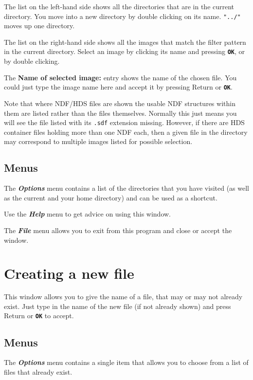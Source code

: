\documentclass[11pt,nolof]{starlink}
\providecommand{\butt}[1]{{\bf \tt #1}}
\providecommand{\menu}[1]{{\bf \em #1}}
\providecommand{\wlab}[1]{{\bf #1}}
\providecommand{\text}[1]{{\tt #1}}
\begin{document}
The list on the left-hand side shows all the directories that are in
the current directory. You move into a new directory by double
clicking on its name. \text{"../"} moves up one directory.

The list on the right-hand side shows all the images that match the filter
pattern in the current directory. Select an image by clicking its name and
pressing \butt{OK}, or by double clicking.

The \wlab{Name of selected image:} entry shows the name of the chosen file.
You could just type the image name here and accept it by pressing Return or
\butt{OK}.

Note that where NDF/HDS files are shown the usable NDF structures
within them are listed rather than the files themselves.
Normally this just means you will see the file listed
with its \text{.sdf} extension missing.  However, if there are HDS
container files holding more than one NDF each, then a given
file in the directory may correspond to multiple images listed
for possible selection.

\subsection{Menus }

The \menu{Options} menu contains a list of the directories that you
have visited (as well as the current and your home directory) and can
be used as a shortcut.

Use the \menu{Help} menu to get advice on using this window.

The \menu{File} menu allows you to exit from this program and close or
accept the window.






\section{Creating a new file }
This window allows you to give the name of a file, that may or may not
already exist. Just type in the name of the new file (if not already
shown) and press Return or \butt{OK} to accept.

\subsection{Menus }
The \menu{Options} menu contains a single item that allows you to choose
from a list of files that already exist.
\end{document}
